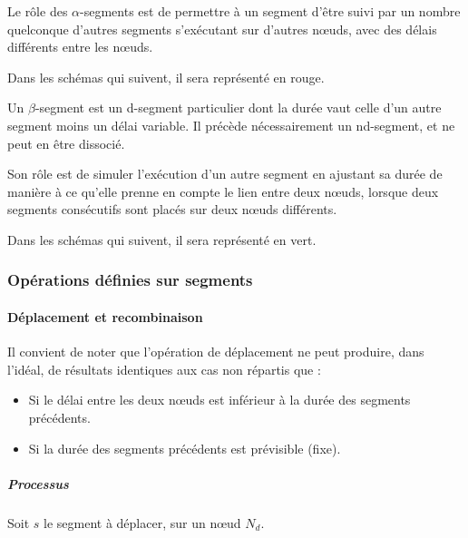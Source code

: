 Le rôle des $\alpha$-segments est de permettre à un segment d'être suivi par un nombre quelconque d'autres segments s'exécutant sur d'autres nœuds, avec des délais différents entre les nœuds.

Dans les schémas qui suivent, il sera représenté en \textcolor{BrickRed}{rouge}.

\begin{mydef}
Un $\beta$-segment est un d-segment particulier dont la durée vaut celle d'un autre segment moins un délai variable. Il précède nécessairement un nd-segment, et ne peut en être dissocié.
\end{mydef}
Son rôle est de simuler l'exécution d'un autre segment en ajustant sa durée de manière à ce qu'elle prenne en compte le lien entre deux nœuds, lorsque deux segments consécutifs sont placés sur deux nœuds différents.

Dans les schémas qui suivent, il sera représenté en \textcolor{OliveGreen}{vert}.
\subsubsection{Opérations définies sur segments}
\paragraph{Déplacement et recombinaison}

Il convient de noter que l'opération de déplacement ne peut produire, dans l'idéal, de résultats identiques aux cas non répartis que : 
\begin{itemize}
\item Si le délai entre les deux nœuds est inférieur à la durée des segments précédents.
\item Si la durée des segments précédents est prévisible (fixe).
\end{itemize} 

\subparagraph{Processus}
Soit $s$ le segment à déplacer, sur un nœud $N_d$.


